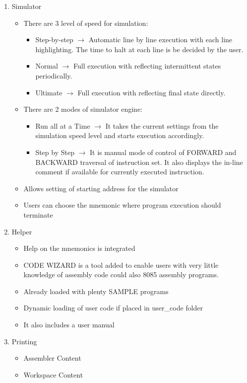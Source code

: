 \begin{enumerate}
\item Simulator
	\begin{itemize}
	\item There are 3 level of speed for simulation: 
		\begin{itemize}
		\item Step-by-step $ \longrightarrow $ Automatic line by line execution with each line highlighting. The time to halt at each line is be decided by the user.
		\item Normal $ \longrightarrow $ Full execution with reflecting intermittent states periodically.
		\item Ultimate $ \longrightarrow $ Full execution with reflecting final state directly.
		\end{itemize}
	\item There are 2 modes of simulator engine:
		\begin{itemize}
		\item Run all at a Time  $ \longrightarrow $ It takes the current settings from the simulation speed level and starts execution accordingly.
		\item Step by Step $ \longrightarrow $ It is manual mode of control of FORWARD and BACKWARD traversal of instruction set. It also displays the in-line comment if available for currently executed instruction.		
		\end{itemize} 
	\item Allows setting of starting address for the simulator
	\item Users can choose the mnemonic where program execution should terminate
	\end{itemize}
\item Helper
	\begin{itemize}
	\item Help on the mnemonics is  integrated
	\item CODE WIZARD is a tool added to enable users with very little knowledge of assembly code could also 8085 assembly programs.
	\item  Already loaded with plenty SAMPLE programs
	\item Dynamic loading of user code if placed in user\_code folder
	\item It also includes a user manual
	\end{itemize}
	
\item Printing
	\begin{itemize}
	\item Assembler Content
	\item Workspace Content
	\end{itemize}
	

\end{enumerate}
